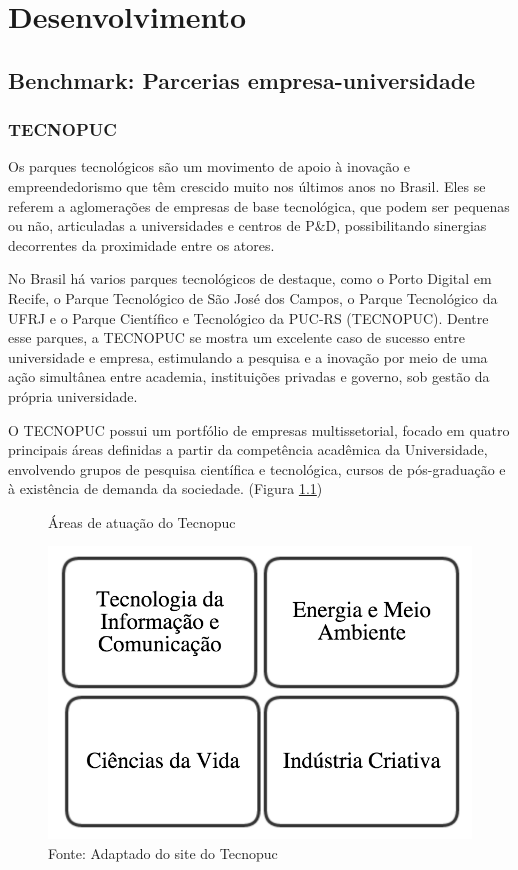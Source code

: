 \chapter{Desenvolvimento}
\label{cha:desenvolvimento}

\section{Benchmark: Parcerias empresa-universidade} %
\label{sec:cases}

\subsection{TECNOPUC}

Os parques tecnológicos são um movimento de apoio à inovação e empreendedorismo que têm crescido muito nos últimos anos no Brasil. Eles se referem a aglomerações de empresas de base tecnológica, que podem ser pequenas ou não, articuladas a universidades e centros de P\&D, possibilitando sinergias decorrentes da proximidade entre os atores. \cite{parquestecnologicos} 

No Brasil há varios parques tecnológicos de destaque, como o Porto Digital em Recife, o Parque Tecnológico de São José dos Campos, o Parque Tecnológico da UFRJ e o Parque Científico e Tecnológico da PUC-RS (TECNOPUC). Dentre esse parques, a TECNOPUC se mostra um excelente caso de sucesso entre universidade e empresa, estimulando a pesquisa e a inovação por meio de uma ação simultânea entre academia, instituições privadas e governo, sob gestão da própria universidade.

O TECNOPUC possui um portfólio de empresas multissetorial, focado em quatro principais áreas definidas a partir da competência acadêmica da Universidade, envolvendo grupos de pesquisa científica e tecnológica, cursos de pós-graduação e à existência de demanda da sociedade. (Figura \ref{fig:tecnopuc})

\begin{figure}
\caption{Áreas de atuação do Tecnopuc}
\centerline{\includegraphics[scale=0.5]{img/tecnopuc}}
\label{fig:tecnopuc}
\caption* {Fonte: Adaptado do site do Tecnopuc}
\end{figure}

